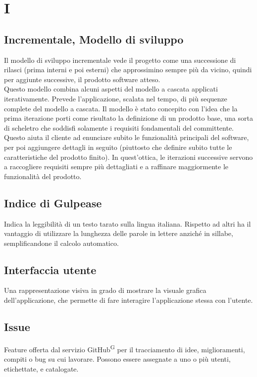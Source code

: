 \section{I}

\subsection{Incrementale, Modello di sviluppo} Il modello di sviluppo incrementale vede il progetto come una successione di rilasci (prima interni e poi esterni) che approssimino sempre più da vicino, quindi per aggiunte successive, il prodotto software atteso. \\ 
Questo modello combina alcuni aspetti del modello a cascata applicati iterativamente. Prevede l’applicazione, scalata nel tempo, di più sequenze complete del modello a cascata. Il modello è stato concepito con l’idea che la prima iterazione porti come risultato la definizione di un prodotto base, una sorta di scheletro che soddisfi solamente i requisiti fondamentali del committente. Questo aiuta il cliente ad enunciare subito le funzionalità principali del software, per poi aggiungere dettagli in seguito (piuttosto che definire subito tutte le caratteristiche del prodotto finito). In quest’ottica, le iterazioni successive servono a raccogliere requisiti sempre più dettagliati e a raffinare maggiormente le funzionalità del prodotto.

\subsection{Indice di Gulpease} Indica la leggibilità di un testo tarato sulla lingua italiana. Rispetto ad altri ha il vantaggio di utilizzare la lunghezza delle parole in lettere anziché in sillabe, semplificandone il calcolo automatico. 

\subsection{Interfaccia utente} Una rappresentazione visiva in grado di mostrare la visuale grafica dell’applicazione, che permette di fare interagire l’applicazione stessa con l’utente.

\subsection{Issue}
Feature offerta dal servizio GitHub\textsuperscript{G} per il tracciamento di idee, miglioramenti, compiti o bug su cui lavorare. Possono essere assegnate a uno o più utenti, etichettate, e catalogate.

\clearpage